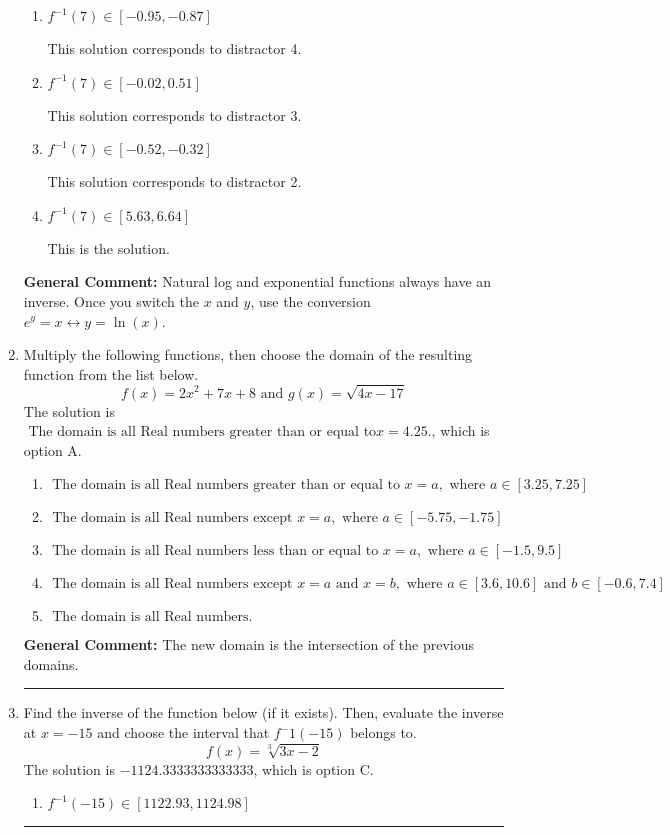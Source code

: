\documentclass{extbook}[14pt]
\newcommand{\litem}[1]{\item #1

\rule{\textwidth}{0.4pt}}
\begin{document}
\begin{enumerate}
{\begin{enumerate}[label=\Alph*.]
 This solution corresponds to distractor 1.
\item \( f^{-1}(7) \in [-0.95, -0.87] \)

 This solution corresponds to distractor 4.
\item \( f^{-1}(7) \in [-0.02, 0.51] \)

 This solution corresponds to distractor 3.
\item \( f^{-1}(7) \in [-0.52, -0.32] \)

 This solution corresponds to distractor 2.
\item \( f^{-1}(7) \in [5.63, 6.64] \)

 This is the solution.
\end{enumerate}

\textbf{General Comment:} Natural log and exponential functions always have an inverse. Once you switch the $x$ and $y$, use the conversion $ e^y = x \leftrightarrow y=\ln(x)$.
}
\litem{
Multiply the following functions, then choose the domain of the resulting function from the list below.
\[ f(x) = 2x^{2} +7 x + 8 \text{ and } g(x) = \sqrt{4x-17}  \]The solution is \( \text{ The domain is all Real numbers greater than or equal to} x = 4.25. \), which is option A.\begin{enumerate}[label=\Alph*.]
\item \( \text{ The domain is all Real numbers greater than or equal to } x = a, \text{ where } a \in [3.25, 7.25] \)


\item \( \text{ The domain is all Real numbers except } x = a, \text{ where } a \in [-5.75, -1.75] \)


\item \( \text{ The domain is all Real numbers less than or equal to } x = a, \text{ where } a \in [-1.5, 9.5] \)


\item \( \text{ The domain is all Real numbers except } x = a \text{ and } x = b, \text{ where } a \in [3.6, 10.6] \text{ and } b \in [-0.6, 7.4] \)


\item \( \text{ The domain is all Real numbers. } \)


\end{enumerate}

\textbf{General Comment:} The new domain is the intersection of the previous domains.
}
\litem{
Find the inverse of the function below (if it exists). Then, evaluate the inverse at $x = -15$ and choose the interval that $f^-1(-15)$ belongs to.
\[ f(x) = \sqrt[3]{3 x - 2} \]The solution is \( -1124.3333333333333 \), which is option C.\begin{enumerate}[label=\Alph*.]
\item \( f^{-1}(-15) \in [1122.93, 1124.98] \)


\end{enumerate}}
\end{enumerate}
\end{document}
